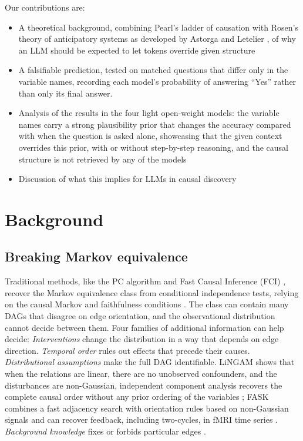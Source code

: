 \documentclass{llncs}
\begin{document}
Our contributions are: 
\begin{itemize}
    \item A theoretical background, combining Pearl's ladder of causation \cite{pearl2009causality,pearl2018theoretical} with Rosen's theory of anticipatory systems \cite{rosen2012anticipatory} as developed by Astorga and Letelier \cite{astorga2026anticipation}, of why an LLM should be expected to let tokens override given structure
    \item A falsifiable prediction, tested on matched questions that differ only in the variable names, recording each model's probability of answering ``Yes'' rather than only its final answer. 
    \item Analysis of the results in the four light open-weight models: the variable names carry a strong plausibility prior that changes the accuracy compared with when the question is asked alone, showcasing that the given context overrides this prior, with or without step-by-step reasoning, and the causal structure is not retrieved by any of the models
    \item Discussion of what this implies for LLMs in causal discovery
\end{itemize}

\section{Background}
\label{sec:background}

\subsection{Breaking Markov equivalence}
\label{sec:mec}

Traditional methods, like the PC algorithm and Fast Causal Inference (FCI) \cite{spirtes2000causation}, recover the Markov equivalence class from conditional independence tests, relying on the causal Markov and faithfulness conditions \cite{glymour2019review}. The class can contain many DAGs that disagree on edge orientation, and the observational distribution cannot decide between them. Four families of additional information can help decide: \textit{Interventions} change the distribution in a way that depends on edge direction. \emph{Temporal order} rules out effects that precede their causes. \emph{Distributional assumptions} make the full DAG identifiable. LiNGAM shows that when the relations are linear, there are no unobserved confounders, and the disturbances are non-Gaussian, independent component analysis recovers the complete causal order without any prior ordering of the variables \cite{shimizu2006linear}; FASK combines a fast adjacency search with orientation rules based on non-Gaussian signals and can recover feedback, including two-cycles, in fMRI time series \cite{sanchez2019estimating}. \emph{Background knowledge} fixes or forbids particular edges \cite{spirtes2016causal,peters2017elements}.
\end{document}
